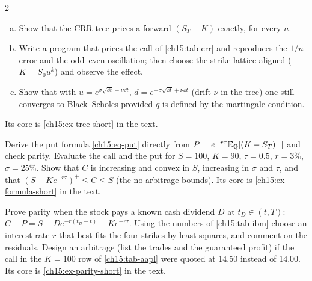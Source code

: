 \begin{paracol}{2}
\begin{exercise}\label{ch15:ex-tree}
\leavevmode
\begin{enumerate}[(a)]
  \item Show that the CRR tree prices a forward $(S_T-K)$ exactly, for every $n$.
  \item Write a program that prices the call of \cref{ch15:tab-crr} and reproduces the $1/n$ error and the odd--even oscillation; then choose the
      strike lattice-aligned ($K=S_0u^{k}$) and observe the effect.
  \item Show that with $u=e^{\sigma\sqrt{\dd t}+\nu\dd t}$, $d=e^{-\sigma\sqrt{\dd t}+\nu\dd t}$ (drift $\nu$ in the tree) one still converges to Black--Scholes provided $q$ is defined by the martingale condition.
\end{enumerate}
Its core is \cref{ch15:ex-tree-short} in the text.
\end{exercise}

\begin{exercise}\label{ch15:ex-formula}
Derive the put formula \eqref{ch15:eq-put} directly from $P=e^{-r\tau}\mathbb{E}_{\mathbb{Q}}[(K-S_T)^+]$ and check parity. Evaluate the call and the put for $S=100$, $K=90$, $\tau=0.5$, $r=3\%$, $\sigma=25\%$.
Show that $C$ is increasing and convex in $S$, increasing in $\sigma$ and $\tau$, and that $(S-Ke^{-r\tau})^+\le C\le S$ (the no-arbitrage bounds).
Its core is \cref{ch15:ex-formula-short} in the text.
\end{exercise}

\begin{exercise}\label{ch15:ex-parity}
Prove parity when the stock pays a known cash dividend $D$ at $t_D\in(t,T)$: $C-P=S-De^{-r(t_D-t)}-Ke^{-r\tau}$. Using the numbers of \cref{ch15:tab-ibm} choose an interest rate $r$ that best fits the four strikes by least squares, and comment on the residuals.
Design an arbitrage (list the trades and the guaranteed profit) if the call in the $K=100$ row of \cref{ch15:tab-aapl} were quoted at 14.50 instead of 14.00.
Its core is \cref{ch15:ex-parity-short} in the text.
\end{exercise}


\end{paracol}
